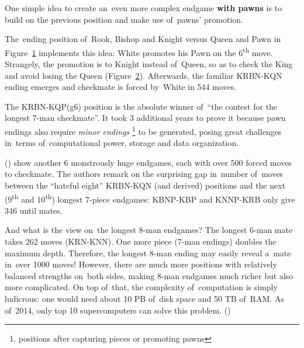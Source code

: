 \begin{itemize}
    One simple idea to create an~even more complex endgame \textbf{with pawns} is to build on the previous position and make use of~pawns' promotion.
    \begin{figure}[H]
      \centering
      \newgame
      \showboard
      \label{fig:longest-7-man-checkmate}
    \end{figure}
    The~ending position of~\rookB Rook, \bishopB Bishop and \knightB Knight versus \queen Queen and \pawn Pawn in Figure~\ref{fig:longest-7-man-checkmate} implements this idea:
    White promotes his \pawn Pawn on the 6\textsuperscript{th} move.
    Strangely, the promotion is to \knight Knight instead of~\queen Queen, so as to check the \kingB King and avoid losing the \queen Queen (Figure~\ref{fig:longest-7-man-checkmate-pawn-promotion}).
    Afterwards, the familiar KRBN-KQN ending emerges and checkmate is forced by~White in 544 moves.
    \begin{figure}[H]
      \centering
      \newgame
      \showboard
      \label{fig:longest-7-man-checkmate-pawn-promotion}
    \end{figure}

    The KRBN-KQP(g6) position is the absolute winner of~``the contest for the longest 7-man checkmate''.
    It took 3 additional years to prove it because pawn endings also require \emph{minor endings}%
    \footnote{positions after capturing pieces or promoting pawns}
    to be generated, posing great challenges in~terms of~computational power, storage and data organization.

    (\cite{Lomonosov2014eightlongest}) show another 6 monstrously huge endgames, each with over 500 forced moves to checkmate.
    The authors remark on the surprising gap in~number of~moves between the ``hateful eight'' KRBN-KQN (and derived) positions and the next (9\textsuperscript{th} and 10\textsuperscript{th}) longest 7-piece endgames:
    KBNP-KBP and KNNP-KRB only give $346$ until mates.

    And what is the view on~the longest 8-man endgames?
    The longest 6-man mate takes 262 moves (KRN-KNN).
    One more piece (7-man endings) doubles the maximum depth.
    Therefore, the longest 8-man ending may easily reveal a~mate in~over 1000 moves!
    However, there are much more positions with relatively balanced strengths on~both sides, making 8-man endgames much richer but also more complicated.
    On top of~that, the complexity of~computation is simply ludicrous:
    one would need about 10 PB of~disk space and 50 TB of~RAM.
    As of~2014, only top 10 supercomputers can solve this problem.
    (\cite{Lomonosov2014eightlongest})
\end{itemize}

